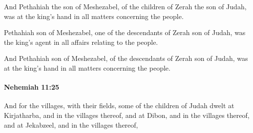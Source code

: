 			\begin{versebox}
					\item[BHS] 
					\item[LXX] 
					\item[ASV] And Pethahiah the son of Meshezabel, of the children of Zerah the son of Judah, was at the king's hand in all matters concerning the people.
					\item[NIV] Pethahiah son of Meshezabel, one of the descendants of Zerah son of Judah, was the king’s agent in all affairs relating to the people.
					\item[NRSV] And Pethahiah son of Meshezabel, of the descendants of Zerah son of Judah, was at the king’s hand in all matters concerning the people.
			\end{versebox}

		\paragraph{Nehemiah 11:25} %
			\label{NEHEMIAH-11-25}

			And for the villages, with their fields, some of the children of Judah dwelt at Kirjatharba, and in the villages thereof, and at Dibon, and in the villages thereof, and at Jekabzeel, and in the villages thereof,

